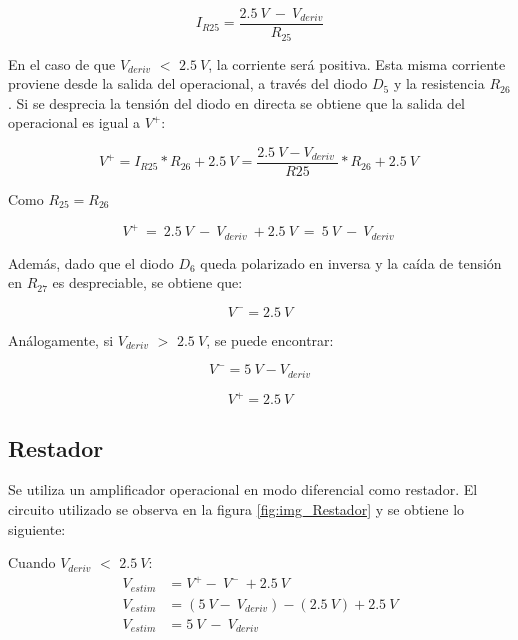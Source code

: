 \begin{equation} \label{eq_corriente_r25}
	I_{R25}=\frac{2.5\:V\ -\ V_{deriv}}{R_{25}}
\end{equation}

En el caso de que $V_{deriv}$ $\mathrm{<}$ $2.5\:V$, la corriente será positiva. Esta misma corriente proviene desde la salida del operacional, a través del diodo $D_5$ y la resistencia $R_{26}$. Si se desprecia la tensión del diodo en directa se obtiene que la salida del operacional es igual a $V^+$:

\begin{equation} \label{eq_V+}
	V^+=I_{R25}*R_{26}+2.5\:V=\frac{2.5\:V-V_{deriv}\ }{R25}*R_{26}+2.5\:V\ 
\end{equation} 

Como $R_{25}=R_{26}$

\begin{equation} \label{eq_V+_2}
	V^+\ =\ 2.5\:V\ -\ V_{deriv}\ +2.5\:V\ =\ 5\:V\ -\ V_{deriv}\ 
\end{equation}

Además, dado que el diodo $D_6$ queda polarizado en inversa y la caída de tensión en $R_{27}$ es despreciable, se obtiene que:
 
 \begin{equation} 
 	V^- = 2.5\:V 
 \end{equation}

Análogamente, si $V_{deriv}$ $\mathrm{>}$ $2.5\:V$, se puede encontrar:

\begin{equation} \label{eq_V+_3}
	V^- =5\:V-V_{deriv} 
\end{equation}

\begin{equation} 
	V^+ = 2.5\:V
\end{equation}


\subsection{Restador}

Se utiliza un amplificador operacional en modo diferencial como restador. El circuito utilizado se observa en la figura \ref{fig:img_Restador} y se obtiene lo siguiente:

Cuando $V_{deriv}$ $\mathrm{<}$ $2.5\:V$:
\begin{equation*} 
	\begin{aligned}
		V_{estim}&=V^+-\ V^-\ +2.5\:V\\ 
		V_{estim}&=(5\:V -\ V_{deriv})-(2.5\: V)+2.5\:V\\
		V_{estim}&=5\: V\ -\ V_{deriv}\\ 
	\end{aligned}
\end{equation*}


